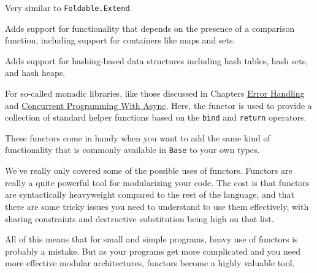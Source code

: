 \begin{description}
\tightlist
\item[\texttt{Container.Make}]
Very similar to \passthrough{\lstinline!Foldable.Extend!}.
\item[\texttt{Comparable.Make}]
Adds support for functionality that depends on the presence of a
comparison function, including support for containers like maps and
sets.
\item[\texttt{Hashable.Make}]
Adds support for hashing-based data structures including hash tables,
hash sets, and hash heaps.
\item[\texttt{Monad.Make}]
For so-called monadic libraries, like those discussed in Chapters
\href{error-handling.html\#error-handling}{Error Handling} and
\href{concurrent-programming.html\#concurrent-programming-with-async}{Concurrent
Programming With Async}. Here, the functor is used to provide a
collection of standard helper functions based on the
\passthrough{\lstinline!bind!} and \passthrough{\lstinline!return!}
operators.
\end{description}

These functors come in handy when you want to add the same kind of
functionality that is commonly available in
\passthrough{\lstinline!Base!} to your own types.

We've really only covered some of the possible uses of functors.
Functors are really a quite powerful tool for modularizing your code.
The cost is that functors are syntactically heavyweight compared to the
rest of the language, and that there are some tricky issues you need to
understand to use them effectively, with sharing constraints and
destructive substitution being high on that list.

All of this means that for small and simple programs, heavy use of
functors is probably a mistake. But as your programs get more
complicated and you need more effective modular architectures, functors
become a highly valuable tool.
